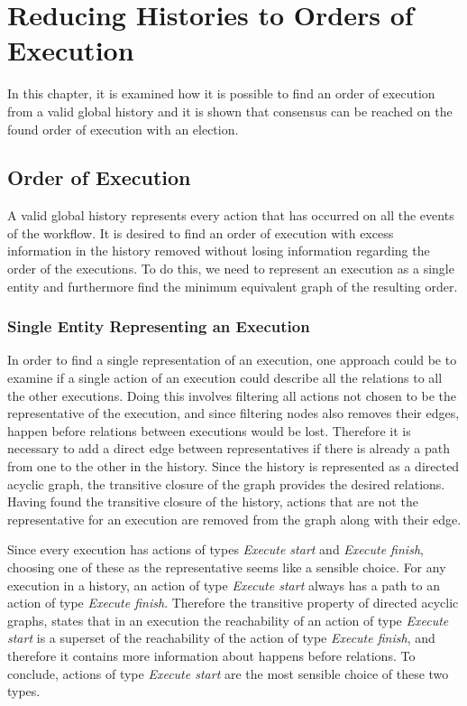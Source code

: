 \chapter{Reducing Histories to Orders of Execution}\label{chap:order-of-execution}
	In this chapter, it is examined how it is possible to find an order of execution from a valid global history and it is shown that consensus can be reached on the found order of execution with an election.

\section{Order of Execution}
	A valid global history represents every action that has occurred on all the events of the workflow.
	It is desired to find an order of execution with excess information in the history removed without losing information regarding the order of the executions. To do this, we need to represent an execution as a single entity and furthermore find the minimum equivalent graph of the resulting order.
	
	\subsection{Single Entity Representing an Execution}
	In order to find a single representation of an execution, one approach could be to examine if a single action of an execution could describe all the relations to all the other executions. Doing this involves filtering all actions not chosen to be the representative of the execution, and since filtering nodes also removes their edges, happen before relations between executions would be lost. Therefore it is necessary to add a direct edge between representatives if there is already a path from one to the other in the history. Since the history is represented as a directed acyclic graph, the transitive closure of the graph provides the desired relations. Having found the transitive closure of the history, actions that are not the representative for an execution are removed from the graph along with their edge.
	
	Since every execution has actions of types \textit{Execute start} and \textit{Execute finish}, choosing one of these as the representative seems like a sensible choice. For any execution in a history, an action of type \textit{Execute start} always has a path to an action of type \textit{Execute finish}. Therefore the transitive property of directed acyclic graphs, states that in an execution the reachability of an action of type \textit{Execute start} is a superset of the reachability of the action of type \textit{Execute finish}, and therefore it contains more information about happens before relations. To conclude, actions of type \textit{Execute start} are the most sensible choice of these two types.
	
